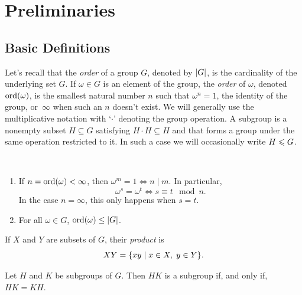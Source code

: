 \chapter{Preliminaries}
\section{Basic Definitions}
\setcounter{subsection}{1}

Let's recall that the \textsl{order} of a group $G$, denoted by $\left\vert{G}\right\vert$, is the cardinality of the underlying set $G$. If $\omega\in G$ is an element of the group, the \textsl{order} of $\omega$, denoted ${\rm ord}(\omega)$, is the smallest natural number $n$ such that $\omega^n=1$, the identity of the group, or~$\infty$ when such an $n$ doesn't exist. We will generally use the multiplicative notation with `$\cdot$' denoting the group operation. A subgroup is a nonempty subset $H\subseteq G$ satisfying $H\cdot H\subseteq H$ and that forms a group under the same operation restricted to it. In such a case we will occasionally write $H\leqslant G$.

\begin{rems}${}$
    \begin{enumerate}[\upshape i)]
        \item If $n={\rm ord}(\omega) < \infty$, then\/ $\omega^m=1\iff n\mid m$. In particular, 
        $$
            \omega^s=\omega^t\iff s\equiv t\mod n.
        $$
        In the case $n=\infty$, this only happens when $s=t$.
    
        \item For all $\omega\in G$, ${\rm ord}(\omega)\le \left\vert{G}\right\vert$.
    \end{enumerate}
\end{rems}

\medskip

If $X$ and $Y$ are subsets of $G$, their \textsl{product} is
$$
    XY =\{xy\mid x\in X,\; y\in Y\}.
$$

\begin{lem}\label{group-commutativity}{}
    Let $H$ and $K$ be subgroups of $G$. Then $HK$ is a subgroup if, and only if, $HK=KH$.
\end{lem}

